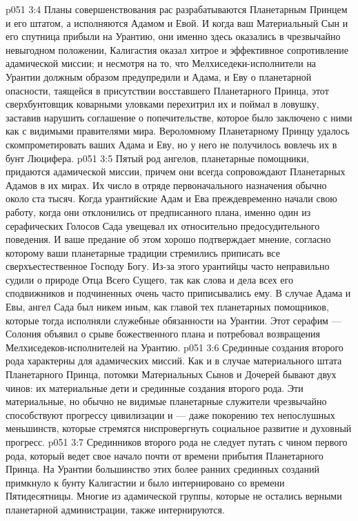 \vs p051 3:4 Планы совершенствования рас разрабатываются Планетарным Принцем и его штатом, а исполняются Адамом и Евой. И когда ваш Материальный Сын и его спутница прибыли на Урантию, они именно здесь оказались в чрезвычайно невыгодном положении, Калигастия оказал хитрое и эффективное сопротивление адамической миссии; и несмотря на то, что Мелхиседеки\hyp{}исполнители на Урантии должным образом предупредили и Адама, и Еву о планетарной опасности, таящейся в присутствии восставшего Планетарного Принца, этот сверхбунтовщик коварными уловками перехитрил их и поймал в ловушку, заставив нарушить соглашение о попечительстве, которое было заключено с ними как с видимыми правителями мира. Вероломному Планетарному Принцу удалось скомпрометировать ваших Адама и Еву, но у него не получилось вовлечь их в бунт Люцифера.
\vs p051 3:5 \pc Пятый род ангелов, планетарные помощники, придаются адамической миссии, причем они всегда сопровождают Планетарных Адамов в их мирах. Их число в отряде первоначального назначения обычно около ста тысяч. Когда урантийские Адам и Ева преждевременно начали свою работу, когда они отклонились от предписанного плана, именно один из серафических Голосов Сада увещевал их относительно предосудительного поведения. И ваше предание об этом хорошо подтверждает мнение, согласно которому ваши планетарные традиции стремились приписать все сверхъестественное Господу Богу. Из\hyp{}за этого урантийцы часто неправильно судили о природе Отца Всего Сущего, так как слова и дела всех его сподвижников и подчиненных очень часто приписывались ему. В случае Адама и Евы, ангел Сада был никем иным, как главой тех планетарных помощников, которые тогда исполняли служебные обязанности на Урантии. Этот серафим --- Солония объявил о срыве божественного плана и потребовал возвращения Мелхиседеков\hyp{}исполнителей на Урантию.
\vs p051 3:6 \pc Срединные создания второго рода характерны для адамических миссий. Как и в случае материального штата Планетарного Принца, потомки Материальных Сынов и Дочерей бывают двух чинов: их материальные дети и срединные создания второго рода. Эти материальные, но обычно не видимые планетарные служители чрезвычайно способствуют прогрессу цивилизации и --- даже покорению тех непослушных меньшинств, которые стремятся ниспровергнуть социальное развитие и духовный прогресс.
\vs p051 3:7 Срединников второго рода не следует путать с чином первого рода, который ведет свое начало почти от времени прибытия Планетарного Принца. На Урантии большинство этих более ранних срединных созданий примкнуло к бунту Калигастии и было интернировано со времени Пятидесятницы. Многие из адамической группы, которые не остались верными планетарной администрации, также интернируются.
